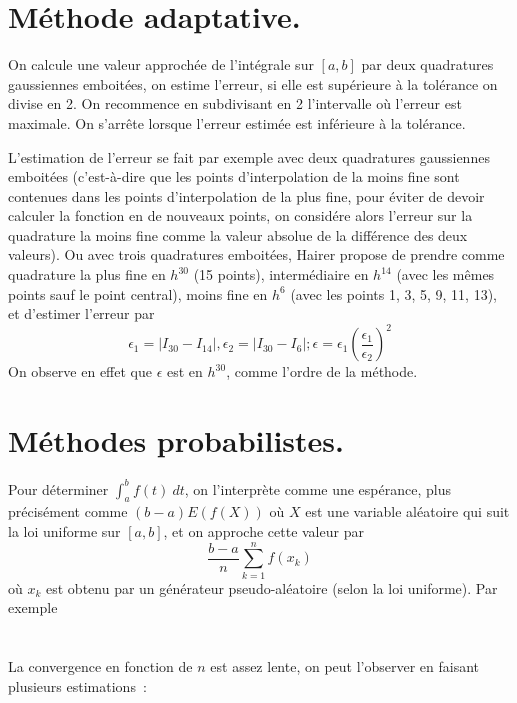 \documentclass[a4paper,11pt]{book}
\begin{document}
\begin{giacjshere}
\section{M\'ethode adaptative.}
On calcule une valeur approch\'ee de l'int\'egrale sur $[a,b]$ par
deux quadratures gaussiennes emboit\'ees, on estime l'erreur,
si elle est sup\'erieure \`a la tol\'erance on divise en 2. On
recommence en subdivisant en 2 l'intervalle o\`u l'erreur est
maximale. On s'arr\^ete lorsque l'erreur estim\'ee est inf\'erieure
\`a la tol\'erance.

L'estimation de l'erreur se fait par exemple avec deux quadratures
gaussiennes emboit\'ees (c'est-\`a-dire que les points d'interpolation
de la moins fine sont contenues dans les points d'interpolation de la
plus fine, pour \'eviter de devoir calculer la fonction en de nouveaux
points, on consid\'ere alors l'erreur sur la quadrature la moins fine
comme la valeur absolue de la diff\'erence des deux valeurs). Ou avec
trois quadratures emboit\'ees,
Hairer propose de prendre comme quadrature la plus fine en $h^{30}$
(15 points), interm\'ediaire en $h^{14}$ (avec les m\^emes points
sauf le point central), moins fine en $h^6$ (avec les points 1, 3, 5,
9, 11, 13), et d'estimer l'erreur par 
$$ \epsilon_1=| I_{30}-I_{14}|,  \epsilon_2=| I_{30}-I_{6}|; 
\epsilon = \epsilon_1 \left(\frac{\epsilon_1}{\epsilon_2} \right)^2 $$
On observe en effet que $\epsilon$ est en $h^{30}$, comme
l'ordre de la m\'ethode.

\section{M\'ethodes probabilistes.} 
Pour d\'eterminer $\int_a^b f(t) \ dt $, on l'interpr\`ete comme
une esp\'erance, plus pr\'ecis\'ement comme $(b-a)E(f(X))$ 
o\`u $X$ est une variable al\'eatoire
qui suit la loi uniforme sur $[a,b]$, et on approche cette valeur
par 
$$ \frac{b-a}{n} \sum_{k=1}^n f(x_k) $$
o\`u $x_k$ est obtenu par un g\'en\'erateur pseudo-al\'eatoire
(selon la loi uniforme).
Par exemple\\
\\
\\
La convergence en fonction de $n$ est assez lente, on peut l'observer
en faisant plusieurs estimations~:\\
\\


\end{giacjshere}
\end{document}
